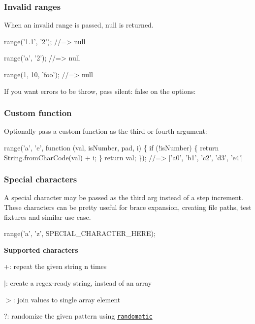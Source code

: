 \subsubsection*{Invalid ranges}

When an invalid range is passed, {\ttfamily null} is returned.


\begin{DoxyCode}
range('1.1', '2');
//=> null

range('a', '2');
//=> null

range(1, 10, 'foo');
//=> null
\end{DoxyCode}


If you want errors to be throw, pass {\ttfamily silent\+: false} on the options\+:

\subsubsection*{Custom function}

Optionally pass a custom function as the third or fourth argument\+:


\begin{DoxyCode}
range('a', 'e', function (val, isNumber, pad, i) \{
  if (!isNumber) \{
    return String.fromCharCode(val) + i;
  \}
  return val;
\});
//=> ['a0', 'b1', 'c2', 'd3', 'e4']
\end{DoxyCode}


\subsubsection*{Special characters}

A special character may be passed as the third arg instead of a step increment. These characters can be pretty useful for brace expansion, creating file paths, test fixtures and similar use case.


\begin{DoxyCode}
range('a', 'z', SPECIAL\_CHARACTER\_HERE);
\end{DoxyCode}


{\bfseries Supported characters}


\begin{DoxyItemize}
\item {\ttfamily +}\+: repeat the given string {\ttfamily n} times
\item {\ttfamily $\vert$}\+: create a regex-\/ready string, instead of an array
\item {\ttfamily $>$}\+: join values to single array element
\item {\ttfamily ?}\+: randomize the given pattern using \href{https://github.com/jonschlinkert/randomatic}{\tt randomatic}
\end{DoxyItemize}

